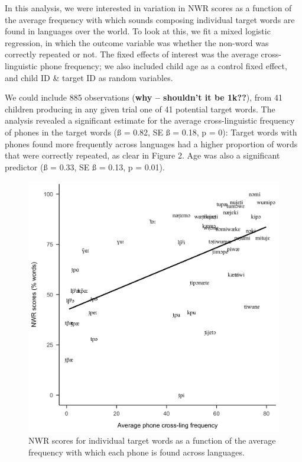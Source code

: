 \documentclass[english,,man,floatsintext]{apa6}
\begin{document}
In this analysis, we were interested in variation in NWR scores as a
function of the average frequency with which sounds composing individual
target words are found in languages over the world. To look at this, we
fit a mixed logistic regression, in which the outcome variable was
whether the non-word was correctly repeated or not. The fixed effects of
interest was the average cross-linguistic phone frequency; we also
included child age as a control fixed effect, and child ID \& target ID
as random variables.

We could include 885 observations (\textbf{why -- shouldn't it be
1k??}), from 41 children producing in any given trial one of 41
potential target words. The analysis revealed a significant estimate for
the average cross-linguistic frequency of phones in the target words (ß
= 0.82, SE ß = 0.18, p = 0): Target words with phones found more
frequently across languages had a higher proportion of words that were
correctly repeated, as clear in Figure 2. Age was also a significant
predictor (ß = 0.33, SE ß = 0.13, p = 0.01).

\begin{figure}[!t]

{\centering \includegraphics[width=0.65\linewidth]{nwr.by.freq.ITEM} 

}

\caption{NWR scores for individual target words as a function of the average frequency with which each phone is found across languages.}\label{fig:Fig2-xling-freq}
\end{figure}
\end{document}
